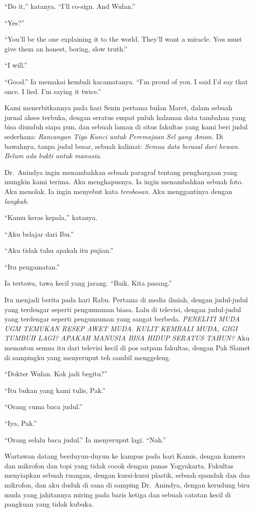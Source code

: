 \documentclass[11pt,twoside,openany]{book}
\makeatletter
\newcommand{\scenebreak}{\par\vspace{0.9em}{\centering\textsc{*\hspace{0.7em}*\hspace{0.7em}*}\par}\vspace{0.9em}\@afterindentfalse\@afterheading}
\makeatother
\begin{document}
``Do it,'' katanya. ``I'll co-sign. And Wulan.''

``Yes?''

``You'll be the one explaining it to the world. They'll want a miracle. You must give them an honest, boring, slow truth.''

``I will.''

``Good.'' Ia memakai kembali kacamatanya. ``I'm proud of you. I said I'd say that once. I lied. I'm saying it twice.''

\scenebreak
Kami menerbitkannya pada hari Senin pertama bulan Maret, dalam sebuah jurnal akses terbuka, dengan seratus empat puluh halaman data tambahan yang bisa diunduh siapa pun, dan sebuah laman di situs fakultas yang kami beri judul sederhana: \emph{Rancangan Tiga Kunci untuk Peremajaan Sel yang Aman.} Di bawahnya, tanpa judul besar, sebuah kalimat: \emph{Semua data berasal dari hewan. Belum ada bukti untuk manusia.}

Dr.~Anindya ingin menambahkan sebuah paragraf tentang penghargaan yang mungkin kami terima. Aku menghapusnya. Ia ingin menambahkan sebuah foto. Aku menolak. Ia ingin menyebut kata \emph{terobosan}. Aku menggantinya dengan \emph{langkah}.

``Kamu keras kepala,'' katanya.

``Aku belajar dari Ibu.''

``Aku tidak tahu apakah itu pujian.''

``Itu pengamatan.''

Ia tertawa, tawa kecil yang jarang. ``Baik. Kita pasang.''

Itu menjadi berita pada hari Rabu. Pertama di media ilmiah, dengan judul-judul yang terdengar seperti pengumuman biasa. Lalu di televisi, dengan judul-judul yang terdengar seperti pengumuman yang sangat berbeda. \emph{PENELITI MUDA UGM TEMUKAN RESEP AWET MUDA.} \emph{KULIT KEMBALI MUDA, GIGI TUMBUH LAGI?} \emph{APAKAH MANUSIA BISA HIDUP SERATUS TAHUN?} Aku menonton semua itu dari televisi kecil di pos satpam fakultas, dengan Pak Slamet di sampingku yang menyeruput teh sambil menggeleng.

``Dokter Wulan. Kok jadi begitu?''

``Itu bukan yang kami tulis, Pak.''

``Orang cuma baca judul.''

``Iya, Pak.''

``Orang selalu baca judul.'' Ia menyeruput lagi. ``Nah.''

Wartawan datang berduyun-duyun ke kampus pada hari Kamis, dengan kamera dan mikrofon dan topi yang tidak cocok dengan panas Yogyakarta. Fakultas menyiapkan sebuah ruangan, dengan kursi-kursi plastik, sebuah spanduk dan dua mikrofon, dan aku duduk di sana di samping Dr.~Anindya, dengan kerudung biru muda yang jahitannya miring pada baris ketiga dan sebuah catatan kecil di pangkuan yang tidak kubuka.
\end{document}
